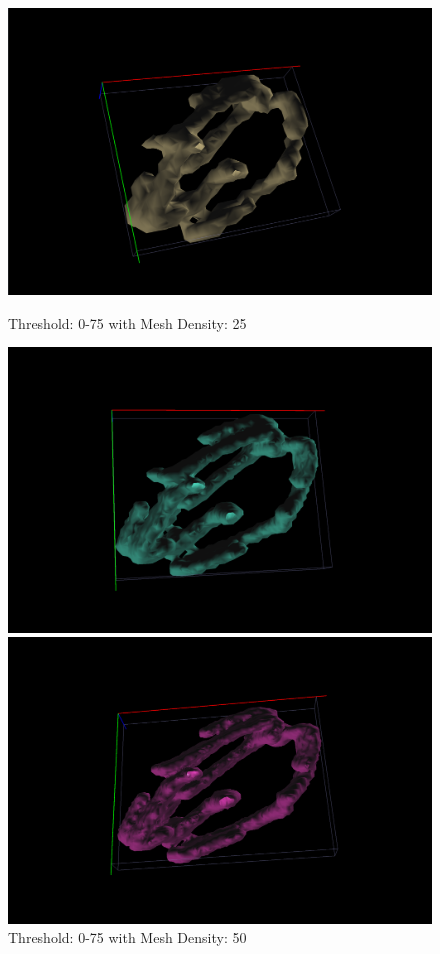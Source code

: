\documentclass{article}
\begin{document}
\begin{figure}[h!]
  \centering
  \begin{minipage}[b]{0.5\linewidth}
    \centering
    \includegraphics[width=.5\linewidth]{Report/Images/6.3.2/0-75,25.png}
    \captionsetup{width=.8\linewidth}
    \caption{Threshold: 0-75 with Mesh Density: 25}
    \label{fig:075_25}
    \vspace{4ex}
  \end{minipage}%
  \begin{minipage}[b]{0.5\linewidth}
    \centering
    \includegraphics[width=.8\linewidth]{Report/Images/6.3.2/0-75,50.png}
    \captionsetup{width=.8\linewidth}
    \caption{Threshold: 0-75 with Mesh Density: 50}
    \label{fig:075_50}
    \vspace{4ex}
  \end{minipage} 
  \begin{minipage}[b]{0.5\linewidth}
    \centering
    \includegraphics[width=.8\linewidth]{Report/Images/6.3.2/0-75,75.png}

\end{minipage}
\end{figure}
\end{document}
